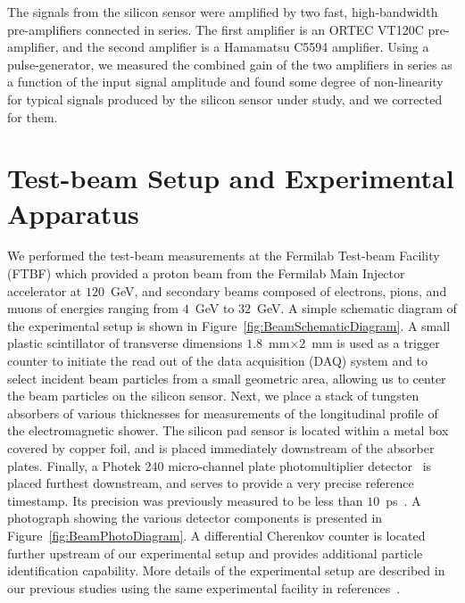 \documentclass[preprint,1p]{elsarticle}
\begin{document}
The signals from the silicon sensor were amplified by two fast, high-bandwidth
pre-amplifiers connected in series. The first amplifier is an ORTEC VT120C
pre-amplifier, and the second amplifier is a Hamamatsu C5594 amplifier. Using a
pulse-generator, we measured the combined gain of the two amplifiers in series
as a function of the input signal amplitude and found some degree of
non-linearity for typical signals produced by the silicon sensor under study,
and we corrected for them.


\section{Test-beam Setup and Experimental Apparatus }
\label{sec:tbeam}

We performed the test-beam measurements at the Fermilab Test-beam Facility
(FTBF) which provided a proton beam from the Fermilab Main Injector accelerator
at $120$~GeV, and secondary beams composed of electrons, pions, and muons of
energies ranging from $4$~GeV to $32$~GeV. A simple schematic diagram of the
experimental setup is shown in Figure~\ref{fig:BeamSchematicDiagram}. A small
plastic scintillator of transverse dimensions $1.8$~mm$\times 2$~mm is used as a
trigger counter to initiate the read out of the data acquisition (DAQ) system
and to select incident beam particles from a small geometric area, allowing us to center the 
beam particles on the silicon sensor. Next, we place a stack of tungsten absorbers of various thicknesses for
measurements of the longitudinal profile of the electromagnetic shower. The
silicon pad sensor is located within a metal box covered by copper foil, and is
placed immediately downstream of the absorber plates. Finally, a Photek 240
micro-channel plate photomultiplier detector~\cite{Anderson:2015gha,
MCPFastCaloNIMA, Ronzhin2015288,Ronzhin201552} is placed furthest downstream,
and serves to provide a very precise reference timestamp. Its precision was
previously measured to be less than $10$~ps~\cite{Ronzhin2015288}. 
A photograph showing the various
detector components is presented in Figure~\ref{fig:BeamPhotoDiagram}. A
differential Cherenkov counter is located further upstream of our experimental
setup and provides additional particle identification capability. More
details of the experimental setup are described in our previous studies using
the same experimental facility in references~\cite{Anderson:2015gha,
MCPFastCaloNIMA, Ronzhin2015288,Ronzhin201552}.
\end{document}
